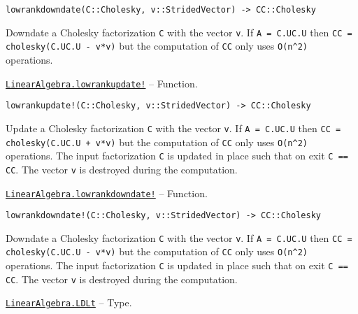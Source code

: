 \begin{adjustwidth}{2em}{0pt}


\begin{verbatim}
lowrankdowndate(C::Cholesky, v::StridedVector) -> CC::Cholesky
\end{verbatim}

Downdate a Cholesky factorization \texttt{C} with the vector \texttt{v}. If \texttt{A = C.U{\textquotesingle}C.U} then \texttt{CC = cholesky(C.U{\textquotesingle}C.U - v*v{\textquotesingle})} but the computation of \texttt{CC} only uses \texttt{O(n{\textasciicircum}2)} operations.



\end{adjustwidth}
\hypertarget{2909160594931213214}{}
\hyperlink{2909160594931213214}{\texttt{LinearAlgebra.lowrankupdate!}}  -- {Function.}

\begin{adjustwidth}{2em}{0pt}


\begin{verbatim}
lowrankupdate!(C::Cholesky, v::StridedVector) -> CC::Cholesky
\end{verbatim}

Update a Cholesky factorization \texttt{C} with the vector \texttt{v}. If \texttt{A = C.U{\textquotesingle}C.U} then \texttt{CC = cholesky(C.U{\textquotesingle}C.U + v*v{\textquotesingle})} but the computation of \texttt{CC} only uses \texttt{O(n{\textasciicircum}2)} operations. The input factorization \texttt{C} is updated in place such that on exit \texttt{C == CC}. The vector \texttt{v} is destroyed during the computation.



\end{adjustwidth}
\hypertarget{15152518260640180506}{}
\hyperlink{15152518260640180506}{\texttt{LinearAlgebra.lowrankdowndate!}}  -- {Function.}

\begin{adjustwidth}{2em}{0pt}


\begin{verbatim}
lowrankdowndate!(C::Cholesky, v::StridedVector) -> CC::Cholesky
\end{verbatim}

Downdate a Cholesky factorization \texttt{C} with the vector \texttt{v}. If \texttt{A = C.U{\textquotesingle}C.U} then \texttt{CC = cholesky(C.U{\textquotesingle}C.U - v*v{\textquotesingle})} but the computation of \texttt{CC} only uses \texttt{O(n{\textasciicircum}2)} operations. The input factorization \texttt{C} is updated in place such that on exit \texttt{C == CC}. The vector \texttt{v} is destroyed during the computation.



\end{adjustwidth}
\hypertarget{5189218595453722756}{}
\hyperlink{5189218595453722756}{\texttt{LinearAlgebra.LDLt}}  -- {Type.}


